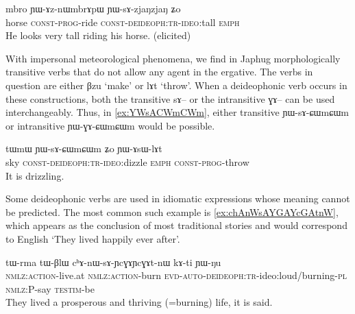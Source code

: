 \documentclass[oldfontcommands,oneside,a4paper,11pt]{article}
\newcommand{\ipa}[1]{{\phon \mbox{#1}}} %
\begin{document}
     \begin{exe}
     \ex \label{ex:YWsAzjaNzjaN2}
\gll
\ipa{mbro} 		\ipa{ɲɯ-ɤz-nɯmbrɤpɯ} \ipa{ɲɯ-sɤ-zjaŋzjaŋ} 	\ipa{ʑo} \\
horse  \textsc{const-prog}-ride \textsc{const-deideoph:tr-ideo}:tall \textsc{emph}\\
\glt He looks very tall riding his horse. (elicited)
\end{exe}

With impersonal meteorological phenomena, we find in Japhug morphologically transitive verbs that do not allow any agent in the ergative. The verbs in question are either \ipa{βzu} `make' or \ipa{lɤt} `throw'. When a deideophonic verb occurs in these constructions, both the transitive \ipa{sɤ--} or the intransitive \ipa{ɣɤ--} can be used interchangeably. Thus, in \ref{ex:YWsACWmCWm}, either transitive	\ipa{ɲɯ-sɤ-ɕɯmɕɯm} or 	intransitive \ipa{ɲɯ-ɣɤ-ɕɯmɕɯm} would be possible.

     \begin{exe}
     \ex \label{ex:YWsACWmCWm}
\gll
\ipa{tɯmɯ} 	\ipa{ɲɯ-sɤ-ɕɯmɕɯm} 	\ipa{ʑo} 	\ipa{ɲɯ-ɤsɯ-lɤt} \\
sky \textsc{const-deideoph:tr-ideo}:dizzle \textsc{emph} \textsc{const-prog}-throw \\
\glt It is drizzling.
\end{exe}
 
Some deideophonic verbs are used in idiomatic expressions whose meaning cannot be predicted. The most common such example is \ref{ex:chAnWsAYGAYcGAtnW}, which appears as the conclusion of most traditional stories and would correspond to English `They lived happily ever after'.

     \begin{exe}
\ex \label{ex:chAnWsAYGAYcGAtnW}
\gll 
\ipa{tɯ-rma}  	\ipa{tɯ-βlɯ}  	\ipa{cʰɤ-nɯ-sɤ-ɲcɣɤɲcɣɤt-nɯ}  	\ipa{kɤ-ti}  	\ipa{ɲɯ-ŋu}  \\
\textsc{nmlz:action}-live.at \textsc{nmlz:action}-burn \textsc{evd-auto-deideoph:tr}-ideo:loud/burning-\textsc{pl} \textsc{nmlz}:P-say \textsc{testim}-be \\
\glt  They lived a prosperous and thriving (=burning) life, it is said.
\end{exe}


 	  
\end{document}
